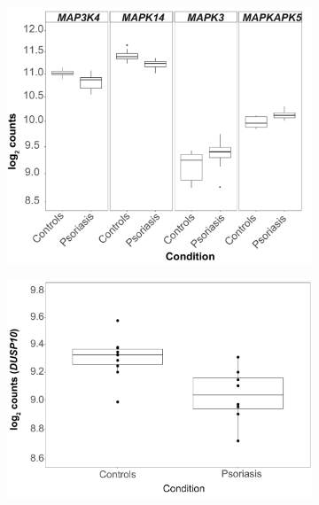 \begin{figure}[htbp]
\begin{subfigure}{0.5\textwidth}
\includegraphics[width=\textwidth]{./Results2/pdfs/RNAseq_PS_CTL_CD8_MAPK_boxplots}
\caption{\textbf{}}
\end{subfigure}
\begin{subfigure}{0.45\textwidth}
\centering
\includegraphics[width=\textwidth]{./Results2/pdfs/RNAseq_PS_CTL_CD14_DUSP10_boxplot}
\caption{\textbf{}}
\end{subfigure}%
\begin{subfigure}{0.45\textwidth}
\centering

\end{subfigure}
\end{figure}
